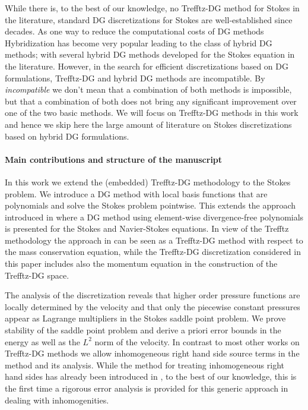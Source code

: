 \documentclass[sn-mathphys,Numbered]{sn-jnl}%
\theoremstyle{remark}%
\theoremstyle{definition}%
\begin{document}
While there is, to the best of our knowledge, no Trefftz-DG method for Stokes in the literature, standard DG discretizations for Stokes are well-established since decades. 
As one way to reduce the computational costs of DG methods Hybridization \cite{cockburn2009unified} has become very popular leading to the class of hybrid DG methods; with several hybrid DG methods developed for the Stokes equation in the literature. 
However, in the search for efficient discretizations based on DG formulations, Trefftz-DG and hybrid DG methods are  incompatible. By \emph{incompatible} we don't mean that
a combination of both methods is impossible, but that a combination of both does not bring any significant improvement over one of the two basic methods. We will focus on Trefftz-DG methods in this work and hence we skip here the large amount of literature on Stokes discretizations based on hybrid DG formulations.
\\[1ex]

\paragraph*{Main contributions and structure of the manuscript}
In this work we extend the (embedded) Trefftz-DG methodology to the Stokes problem. We introduce a DG method with local basis functions that are polynomials and solve the Stokes problem pointwise.
This extends the approach introduced in \cite{montlaur2010discontinuous,montlaur08} where a DG method using element-wise divergence-free polynomials is presented for the Stokes and Navier-Stokes equations. In view of the Trefftz methodology the approach in \cite{montlaur2010discontinuous,montlaur08} can be seen as a Trefftz-DG method with respect to the mass conservation equation, while the Trefftz-DG discretization considered in this paper includes also the momentum equation in the construction of the Trefftz-DG space. 

The analysis of the discretization reveals that higher order pressure functions are locally determined by the velocity and that only the piecewise constant pressures appear as Lagrange multipliers in the Stokes saddle point problem. We prove stability of the saddle point problem and derive a priori error bounds in the energy as well as the $L^2$ norm of the velocity. In contrast to most other works on Trefftz-DG methods we allow inhomogeneous right hand side source terms in the method and its analysis. While the method for treating inhomogeneous right hand sides has already been introduced in \cite{2201.07041}, to the best of our knowledge, this is the first time a rigorous error analysis is provided for this generic approach in dealing with inhomogenities.
\end{document}
